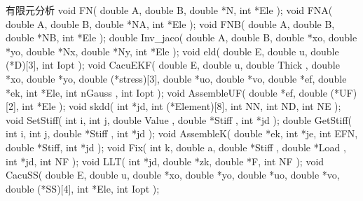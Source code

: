 \documentclass[color=orange,openany]{textbook-cn}
\begin{document}
\begin{Exercise}
\begin{QsNum}
\item \lipsum[1][1-2]
\item \lipsum[1][1-2]
\item \lipsum[1][1-2]
\item \lipsum[1][1-2]
\item \lipsum[1][1-2]
\item \lipsum[1][1-2]
\item \lipsum[1][1-2]
\item \lipsum[1][1-2]
\end{QsNum}
\begin{QsNum}
\item \lipsum[1][1-2]
\item \lipsum[1][1-2]
\item \lipsum[1][1-2]
\item \lipsum[1][1-2]
\item \lipsum[1][1-2]
\end{QsNum}
\begin{QsNum}
\item \lipsum[1][1-2]
\item \lipsum[1][1-2]
\item \lipsum[1][1-2]
\item \lipsum[1][1-2]
\item \lipsum[1][1-2]
\item \lipsum[1][1-2]
\item \lipsum[1][1-2]
\item \lipsum[1][1-2]
\end{QsNum}
\tcblower
\lipsum[1]
\end{Exercise}




\begin{CppBox}{有限元分析}
void FN( double A, double B, double *N, int *Ele );
void FNA( double A, double B, double *NA, int *Ele );
void FNB( double A, double B, double *NB, int *Ele );
double Inv_jaco( double A, double B, double *xo, double *yo, double *Nx, double *Ny, int *Ele );
void eld( double E, double u, double (*D)[3], int Iopt );
void CacuEKF( double E, double u, double Thick , double *xo, double *yo, double (*stress)[3], double *uo, double *vo, double *ef, double *ek, int *Ele, int nGauss , int Iopt );
void AssembleUF( double *ef, double (*UF)[2], int *Ele );
void skdd( int *jd, int (*Element)[8], int NN, int ND, int NE );
void SetStiff( int i, int j, double Value , double *Stiff , int *jd );
double GetStiff( int i, int j, double *Stiff , int *jd );
void AssembleK( double *ek, int *je, int EFN, double *Stiff, int *jd );
void Fix( int k, double a, double *Stiff , double *Load , int *jd, int NF );
void LLT( int *jd, double *zk, double *F, int NF );
void CacuSS( double E, double u, double *xo, double *yo, double *uo, double *vo, double (*SS)[4], int *Ele, int Iopt );
\end{CppBox}
\end{document}

